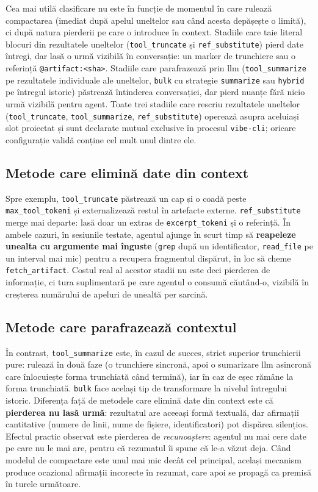 \documentclass[12pt, a4paper, oneside, romanian]{teza-upb}
\begin{document}
  Cea mai utilă clasificare nu este în funcție de momentul în care rulează compactarea (imediat după apelul uneltelor sau când acesta depășește o limită), ci după natura pierderii pe care o introduce în context. Stadiile care taie literal blocuri din
  rezultatele uneltelor (\texttt{tool\_truncate} și \texttt{ref\_substitute}) pierd date întregi, dar lasă o urmă vizibilă în conversație: un marker de trunchiere sau o referință \texttt{@artifact:<sha>}.
  Stadiile care parafrazează prin \ac{llm} (\texttt{tool\_summarize} pe rezultatele individuale ale uneltelor, \texttt{bulk} cu strategie \texttt{summarize} sau \texttt{hybrid} pe întregul istoric)
  păstrează întinderea conversației, dar pierd nuanțe fără nicio urmă vizibilă pentru agent. Toate trei stadiile care rescriu rezultatele uneltelor (\texttt{tool\_truncate}, \texttt{tool\_summarize},
  \texttt{ref\_substitute}) operează asupra aceluiași slot proiectat și sunt declarate mutual exclusive în procesul \texttt{vibe-cli}; oricare configurație validă conține cel mult unul dintre ele.

  \subsection{Metode care elimină date din context}

    Spre exemplu, \texttt{tool\_truncate} păstrează un cap și o coadă peste \texttt{max\_tool\_tokeni} și externalizează restul în artefacte externe.
    \texttt{ref\_substitute} merge mai departe: lasă doar un extras de \texttt{excerpt\_tokeni} și o referință. În ambele cazuri, în sesiunile testate, agentul ajunge în scurt timp să
    \textbf{reapeleze unealta cu argumente mai înguste} (\texttt{grep} după un identificator, \texttt{read\_file} pe un interval mai mic) pentru a recupera fragmentul dispărut, în loc să cheme \texttt{fetch\_artifact}.
    Costul real al acestor stadii nu este deci pierderea de informație, ci tura suplimentară pe care agentul o consumă căutând-o, vizibilă în creșterea numărului
    de apeluri de unealtă per sarcină.

  \subsection{Metode care parafrazează contextul}

    În contrast, \texttt{tool\_summarize} este, în cazul de succes, strict superior trunchierii pure: rulează în două faze (o trunchiere sincronă, apoi o sumarizare \ac{llm} asincronă care înlocuiește forma
    trunchiată când termină), iar în caz de eșec rămâne la forma trunchiată. \texttt{bulk} face același tip de transformare la nivelul întregului istoric.
    Diferența față de metodele care elimină date din context este că \textbf{pierderea nu lasă urmă}: rezultatul are aceeași formă textuală, dar afirmații cantitative (numere de linii, nume de fișiere, identificatori) pot
    dispărea silențios. Efectul practic observat este pierderea de \textit{recunoaștere}: agentul nu mai cere date pe care nu le mai are, pentru că rezumatul îi spune că le-a văzut deja.
    Când modelul de compactare este unul mai mic decât cel principal, același mecanism produce ocazional afirmații incorecte în rezumat,
    care apoi se propagă ca premisă în turele următoare.
\end{document}
